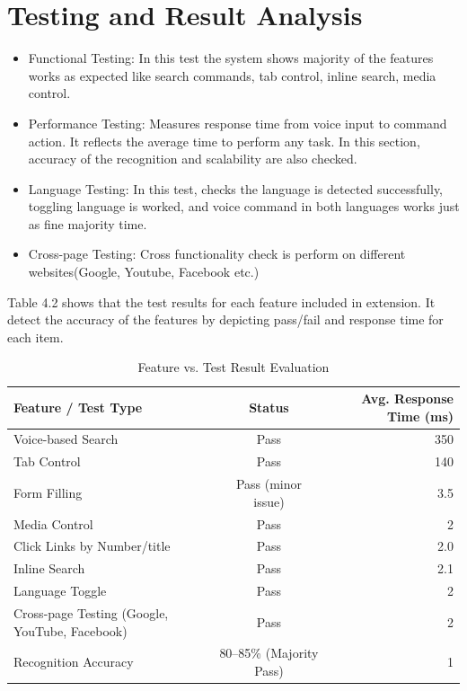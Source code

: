 \section{Testing and Result Analysis}
\begin{itemize}
\item	Functional Testing: In this test the system shows majority of the features works as expected like search commands, tab control, inline search, media control.
\item	Performance Testing: Measures response time from voice input to command action. It reflects the average time to perform any task. In this section, accuracy of the recognition and scalability are also checked. 
\item	Language Testing: In this test, checks the language is detected successfully, toggling language is worked, and voice command in both languages works just as fine majority time.
\item	Cross-page Testing: Cross functionality check is perform on different websites(Google, Youtube, Facebook etc.)
\end{itemize}


Table 4.2 shows that the test results for each feature included in extension. It detect the accuracy of the features by depicting pass/fail and response time for each item.

\begin{table}[H]
    \centering
    \caption{Feature vs. Test Result Evaluation\cite{voiceweb_test_results}}
    \label{tab:feature_test_results_professional}
    \begin{tabularx}{\textwidth}{>{\RaggedRight\arraybackslash}X c r}
        \toprule
        \textbf{Feature / Test Type} & \textbf{Status} & \textbf{Avg. Response Time (ms)} \\
        \midrule
        Voice-based Search                  & \textcolor{green!70!black}{Pass} & 350 \\ 
        Tab Control                         & \textcolor{green!70!black}{Pass} & 140 \\ 
        Form Filling                        & \textcolor{orange!80!black}{Pass (minor issue)} & 3.5 \\ 
        Media Control                     & \textcolor{green!70!black}{Pass} & 2 \\  
        Click Links by Number/title      &   
        \textcolor{green!70!black}{Pass} & 2.0 \\
        Inline Search                    &   \textcolor{green!70!black}{Pass} & 2.1 \\
        Language Toggle                     & \textcolor{green!70!black}{Pass} &  2 \\
        Cross-page Testing (Google, YouTube, Facebook) & \textcolor{green!70!black}{Pass} & 2 \\
        Recognition Accuracy                & \textcolor{blue!70!black}{80--85\% (Majority Pass)} & 1 \\
        \bottomrule
    \end{tabularx}
\end{table}


